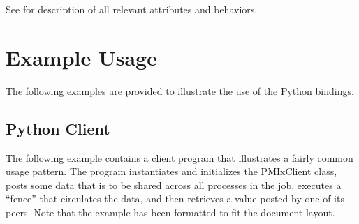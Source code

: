 See  for description of all relevant attributes and behaviors.


\section{Example Usage}
\label{app:python:examples}

The following examples are provided to illustrate the use of the Python bindings.

\subsection{Python Client}

The following example contains a client program that illustrates a fairly common usage pattern. The program instantiates and initializes the PMIxClient class, posts some data that is to be shared across all processes in the job, executes a “fence” that circulates the data, and then retrieves a value posted by one of its peers. Note that the example has been formatted to fit the document layout.


